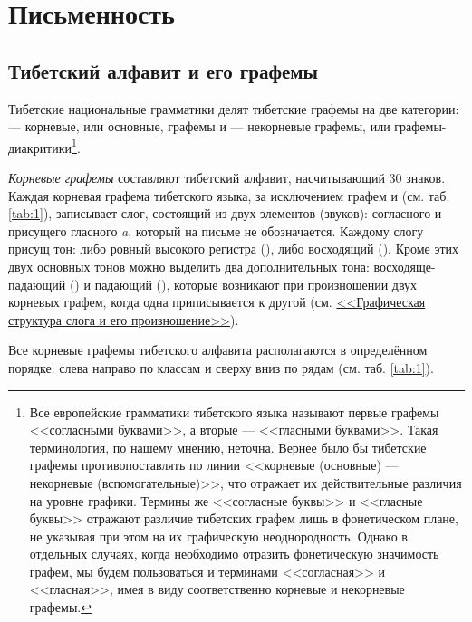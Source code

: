 \chapter{Письменность}
\section{Тибетский алфавит и его графемы}
Тибетские национальные грамматики делят тибетские графемы на две категории:  --- корневые, или основные, графемы и  --- некорневые графемы, или графемы-диакритики\footnote[9]{Все европейские грамматики тибетского языка называют первые графемы <<согласными буквами>>, а вторые --- <<гласными буквами>>. Такая терминология, по нашему мнению, неточна. Вернее было бы тибетские графемы противопоставлять по линии <<корневые (основные) --- некорневые (вспомогательные)>>, что отражает их действительные различия на уровне графики. Термины же <<согласные буквы>> и <<гласные буквы>> отражают различие тибетских графем лишь в фонетическом плане, не указывая при этом на их графическую неоднородность. Однако в отдельных случаях, когда необходимо отразить фонетическую значимость графем, мы будем пользоваться и терминами <<согласная>> и <<гласная>>, имея в виду соответственно корневые и некорневые графемы.}.

\emph{Корневые графемы} составляют тибетский алфавит, насчитывающий 30 знаков. Каждая корневая графема тибетского языка, за исключением графем  и  (см. таб. \ref{tab:1}), записывает слог, состоящий из двух элементов (звуков): согласного и присущего гласного \emph{a}, который на письме не обозначается. Каждому слогу присущ тон: либо ровный высокого регистра (\toneR), либо восходящий (\toneV). Кроме этих двух основных тонов можно выделить два дополнительных тона: восходяще-падающий (\toneVN) и падающий (\toneN), которые возникают при произношении двух корневых графем, когда одна приписывается к другой (см. \hyperref[sec:gss]{<<Графическая структура слога и его произношение>>}).

Все корневые графемы тибетского алфавита располагаются в определённом порядке: слева направо по классам и сверху вниз по рядам (см. таб. \ref{tab:1}).

